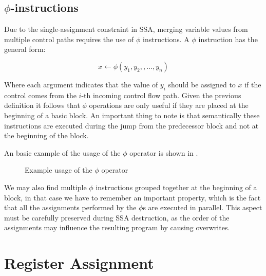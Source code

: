 \subsection{$\phi$-instructions}
\label{subsec:phi}

Due to the single-assignment constraint in SSA, merging variable values from multiple control paths requires the use of $\phi$ instructions. A $\phi$ instruction has the general form:

\[
x \leftarrow \phi(y_1, y_2, , \dots, y_n)
\]

Where each argument indicates that the value of $y_i$ should be assigned to $x$ if the control comes from the $i$-th incoming control flow path. Given the previous definition it follows that $\phi$ operations are only useful if they are placed at the beginning of a basic block. An important thing to note is that semantically these instructions are executed during the jump from the predecessor block and not at the beginning of the block.

An basic example of the usage of the $\phi$ operator is shown in .

\begin{figure}[ht]
    \centering
    \caption{Example usage of the $\phi$ operator}
    \label{fig:phi-usage}
\end{figure}

We may also find multiple $\phi$ instructions grouped together at the beginning of a block, in that case we have to remember an important property, which is the fact that all the assignments performed by the $\phi$s are executed in parallel. This aspect must be carefully preserved during SSA destruction, as the order of the assignments may influence the resulting program by causing overwrites.

\section{Register Assignment}
\label{sec:ra}

